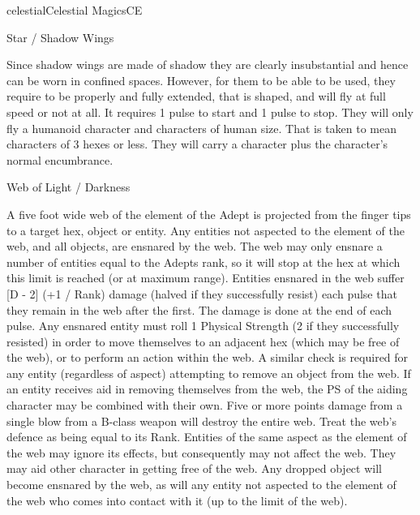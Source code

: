 \begin{college}[1.3]{celestial}{Celestial Magics}{CE}
\begin{spell}[S-5]{Star / Shadow Wings}
\begin{effects}
Since shadow wings are made of shadow they are clearly insubstantial
and hence can be worn in confined spaces.  However, for them to be
able to be used, they require to be properly and fully extended, that
is shaped, and will fly at full speed or not at all.  It requires 1
pulse to start and 1 pulse to stop.  They will only fly a humanoid
character and characters of human size.  That is taken to mean
characters of 3 hexes or less.  They will carry a character plus the
character's normal encumbrance.
\end{effects}
\end{spell}

\begin{spell}[S-6]{Web of Light / Darkness}

\begin{effects}
A five foot wide web of the element of the Adept is projected from the
finger tips to a target hex, object or entity.  Any entities not
aspected to the element of the web, and all objects, are ensnared by
the web.  The web may only ensnare a number of entities equal to the
Adepts rank, so it will stop at the hex at which this limit is reached
(or at maximum range).  Entities ensnared in the web suffer [D - 2]
(+1 / Rank) damage (halved if they successfully resist) each pulse
that they remain in the web after the first.  The damage is done at
the end of each pulse.  Any ensnared entity must roll 1 \x Physical
Strength (2 \x if they successfully resisted) in order to move
themselves to an adjacent hex (which may be free of the web), or to
perform an action within the web.  A similar check is required for any
entity (regardless of aspect) attempting to remove an object from the
web.  If an entity receives aid in removing themselves from the web,
the PS of the aiding character may be combined with their own.  Five
or more points damage from a single blow from a B-class weapon will
destroy the entire web.  Treat the web's defence as being equal to its
Rank.  Entities of the same aspect as the element of the web may
ignore its effects, but consequently may not affect the web.  They may
aid other character in getting free of the web.  Any dropped object
will become ensnared by the web, as will any entity not aspected to
the element of the web who comes into contact with it (up to the limit
of the web).
\end{effects}
\end{spell}


\end{college}
